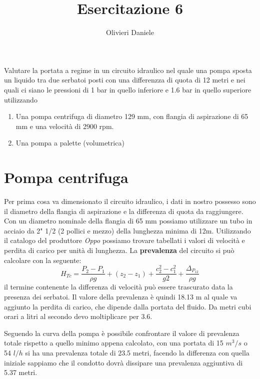 \documentclass[a4paper,12pt]{article}
\title{Esercitazione 6}
\author{Olivieri Daniele}
\date{}
\begin{document}
\maketitle
Valutare la portata a regime in un circuito idraulico nel quale una pompa sposta un liquido tra due serbatoi posti con una differenzza di quota
di 12 metri e nei quali ci siano le pressioni di 1 bar in quello inferiore e 1.6 bar in quello superiore utilizzando
\begin{enumerate}
    \item Una pompa centrifuga di diametro 129 mm, con flangia di aspirazione di 65 mm e una velocità di 2900 rpm.
    \item Una pompa a palette (volumetrica)
\end{enumerate}

\section{Pompa centrifuga}
Per prima cosa va dimensionato il circuito idraulico, i dati in nostro possesso sono il diametro della flangia di aspirazione e la differenza di quota da raggiungere.
Con un diametro nominale della flangia di 65 mm possiamo utilizzare un tubo in acciaio da 2" 1/2 (2 pollici e mezzo) della lunghezza minima di 12m.
Utilizzando il catalogo del produttore \textit{Oppo} possiamo trovare tabellati i valori di velocità e perdita di carico per unità di lunghezza.
La \textbf{prevalenza} del circuito si può calcolare con la seguente:
\begin{equation}
    H_{Tc} = \frac{P_2-P_1}{\rho g} + (z_2-z_1) + \frac{c_2^2-c_1^2}{g2} + \frac{\Delta_{P_{12}}}{\rho g}
\end{equation}
il termine contenente la differenza di velocità può essere trascurato data la presenza dei serbatoi.
Il valore della prevalenza è quindi 18.13 m al quale va aggiunto la perdita di carico, che dipende dalla portata del fluido.
Da metri cubi orari a litri al secondo devo moltiplicare per 3.6.

Seguendo la curva della pompa è possibile confrontare il valore di prevalenza totale rispetto a quello minimo appena calcolato,
con una portata di 15 $m^3/s$ o 54 $l/h$ si ha una prevalenza totale di 23.5 metri, facendo la differenza con quella iniziale sappiamo che
il condotto dovrà dissipare una prevalenza aggiuntiva di 5.37 metri.
\end{document}
